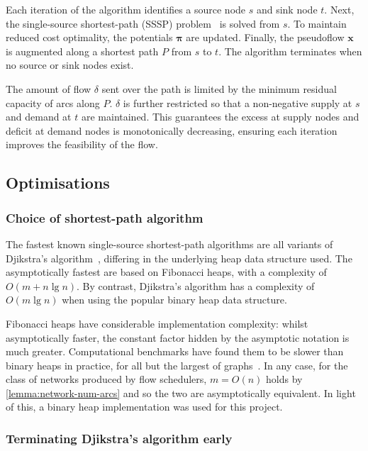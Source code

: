 Each iteration of the algorithm identifies a source node $s$ and sink node $t$. Next, the single-source shortest-path (SSSP) problem~\cite[ch.~24]{CLRS:2009} is solved from $s$. To maintain reduced cost optimality, the potentials $\boldsymbol{\pi}$ are updated. Finally, the pseudoflow $\mathbf{x}$ is augmented along a shortest path $P$ from $s$ to $t$. The algorithm terminates when no source or sink nodes exist.

The amount of flow $\delta$ sent over the path is limited by the minimum residual capacity of arcs along $P$. $\delta$ is further restricted so that a non-negative supply at $s$ and demand at $t$ are maintained. This guarantees the excess at supply nodes and deficit at demand nodes is monotonically decreasing, ensuring each iteration improves the feasibility of the flow.

\subsection{Optimisations} \label{sec:impl-ssp-optimisations}

\subsubsection{Choice of shortest-path algorithm}
The fastest known single-source shortest-path algorithms are all variants of Djikstra's algorithm~\cite[ch.~4]{Ahuja:1993}, differing in the underlying heap data structure used. The asymptotically fastest are based on Fibonacci heaps, with a complexity of $O(m + n\lg n)$. By contrast, Djikstra's algorithm has a complexity of $O(m\lg n)$ when using the popular binary heap data structure.

Fibonacci heaps have considerable implementation complexity: whilst asymptotically faster, the constant factor hidden by the asymptotic notation is much greater. Computational benchmarks have found them to be slower than binary heaps in practice, for all but the largest of graphs~\cite[p.~15]{KiralyKovacs:2012}. In any case, for the class of networks produced by flow schedulers, $m = O(n)$ holds by \cref{lemma:network-num-arcs} and so the two are asymptotically equivalent. In light of this, a binary heap implementation was used for this project.

\subsubsection{Terminating Djikstra's algorithm early}

